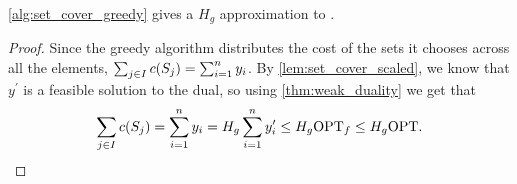 \begin{theorem}
    \cref{alg:set_cover_greedy} gives a $H_g$ approximation to \setcover{}. 
    \label{thm:approx_set_cover_dual_fitting}
\end{theorem}
\begin{proof}
    Since the greedy algorithm distributes the cost of the sets it chooses across all the elements, 
    $\sum_{j \in I} \f[c]{S_j} = \sum_{i=1}^{n} y_i$. By \cref{lem:set_cover_scaled}, we know that $y^\prime$ is a feasible solution to the dual, 
    so using \cref{thm:weak_duality} we get that 
    \begin{equation*}   
        \sum_{j \in I} \f[c]{S_j} = \sum_{i=1}^{n} y_i = H_g \sum_{i=1}^{n} y_i^\prime \leq H_g \OPT_f \leq H_g \OPT. 
    \end{equation*}
\end{proof}


